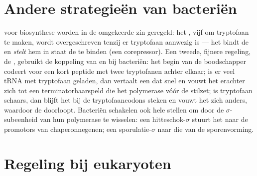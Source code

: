 \section{Andere strategieën van bacteriën}

\begin{proposition}\label{prop:b1:expression-control:trp}
 voor biosynthese worden in de omgekeerde zin geregeld: het
\emph{}, vijf  om tryptofaan te maken, wordt overgeschreven tenzij
er tryptofaan aanwezig is --- het  bindt de  en \emph{stelt}
hem in staat de  te binden (een corepressor). Een tweede, fijnere regeling,
de \emph{}, gebruikt de koppeling van  en  bij
bacteriën: het begin van de boodschapper codeert voor een kort peptide met twee
tryptofanen achter elkaar; is er veel tRNA met tryptofaan geladen, dan vertaalt een
 dat snel en vouwt het  erachter zich tot een terminatorhaarspeld die
het polymerase vóór de  stilzet; is tryptofaan schaars, dan blijft het
 bij de tryptofaancodons steken en vouwt het  zich anders, waardoor de
 doorloopt. Bacteriën schakelen ook hele stellen  om door de
$\sigma$-subeenheid van hun polymerase te wisselen: een hitteschok-$\sigma$ stuurt
het naar de promotors van chaperonnegenen; een sporulatie-$\sigma$ naar die van de
sporenvorming.
\end{proposition}

\section{Regeling bij eukaryoten}

